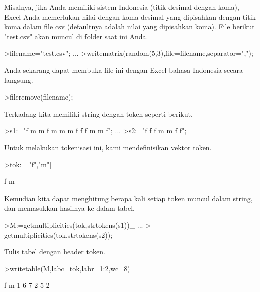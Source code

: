 \documentclass[a4paper,10pt]{article}
\begin{document}
\begin{eulernotebook}
\begin{eulercomment}
\begin{eulercomment}
\begin{eulercomment}
\begin{eulercomment}
\begin{eulercomment}
\begin{eulercomment}
\begin{eulercomment}
\begin{eulercomment}
\begin{eulercomment}
Misalnya, jika Anda memiliki sistem Indonesia (titik desimal dengan
koma), Excel Anda memerlukan nilai dengan koma desimal yang dipisahkan
dengan titik koma dalam file csv (defaultnya adalah nilai yang
dipisahkan koma). File berikut "test.csv" akan muncul di folder saat
ini Anda.
\end{eulercomment}
\begin{eulerprompt}
>filename="test.csv"; ...
>writematrix(random(5,3),file=filename,separator=",");
\end{eulerprompt}
\begin{eulercomment}
Anda sekarang dapat membuka file ini dengan Excel bahasa Indonesia
secara langsung.
\end{eulercomment}
\begin{eulerprompt}
>fileremove(filename);
\end{eulerprompt}
\begin{eulercomment}
Terkadang kita memiliki string dengan token seperti berikut.
\end{eulercomment}
\begin{eulerprompt}
>s1:="f m m f m m m f f f m m f";  ...
>s2:="f f f m m f f";
\end{eulerprompt}
\begin{eulercomment}
Untuk melakukan tokenisasi ini, kami mendefinisikan vektor token.
\end{eulercomment}
\begin{eulerprompt}
>tok:=["f","m"]
\end{eulerprompt}
\begin{euleroutput}
  f
  m
\end{euleroutput}
\begin{eulercomment}
Kemudian kita dapat menghitung berapa kali setiap token muncul dalam
string, dan memasukkan hasilnya ke dalam tabel.
\end{eulercomment}
\begin{eulerprompt}
>M:=getmultiplicities(tok,strtokens(s1))_ ...
>  getmultiplicities(tok,strtokens(s2));
\end{eulerprompt}
\begin{eulercomment}
Tulis tabel dengan header token.
\end{eulercomment}
\begin{eulerprompt}
>writetable(M,labc=tok,labr=1:2,wc=8)
\end{eulerprompt}
\begin{euleroutput}
                 f       m
         1       6       7
         2       5       2
\end{euleroutput}

\end{eulercomment}
\end{eulercomment}
\end{eulercomment}
\end{eulercomment}
\end{eulercomment}
\end{eulercomment}
\end{eulercomment}
\end{eulercomment}
\end{eulernotebook}
\end{document}
